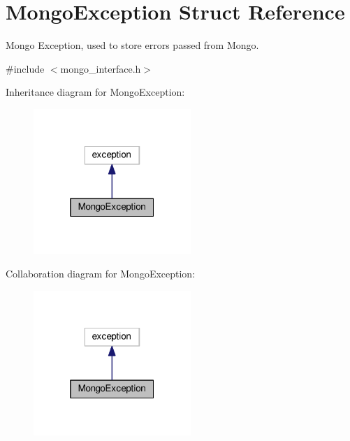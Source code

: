 \hypertarget{structMongoException}{}\section{Mongo\+Exception Struct Reference}
\label{structMongoException}


Mongo Exception, used to store errors passed from Mongo.  




{\ttfamily \#include $<$mongo\+\_\+interface.\+h$>$}



Inheritance diagram for Mongo\+Exception\+:
\nopagebreak
\begin{figure}[H]
\begin{center}
\leavevmode
\includegraphics[width=169pt]{structMongoException__inherit__graph}
\end{center}
\end{figure}


Collaboration diagram for Mongo\+Exception\+:
\nopagebreak
\begin{figure}[H]
\begin{center}
\leavevmode
\includegraphics[width=169pt]{structMongoException__coll__graph}
\end{center}
\end{figure}
